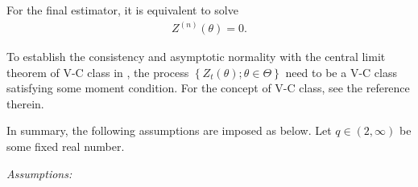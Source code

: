 \documentclass[a4paper,12pt]{article}
\begin{document}
For the final estimator, it is equivalent to solve 
\begin{align}
Z^{(n)}(\theta)=0.
\end{align}

To establish the consistency and asymptotic normality with the central limit theorem of V-C class in \citet{ArconesYu1994}, the process $\left\{ Z_t(\theta);\theta\in \Theta \right\}$ need to be a V-C class satisfying some moment condition. For the concept of V-C class, see the reference therein.

In summary, the following assumptions are imposed as below.
Let $q\in(2,\infty)$ be some fixed real number.

\vspace{0.4cm}
{\em Assumptions:}
\end{document}

